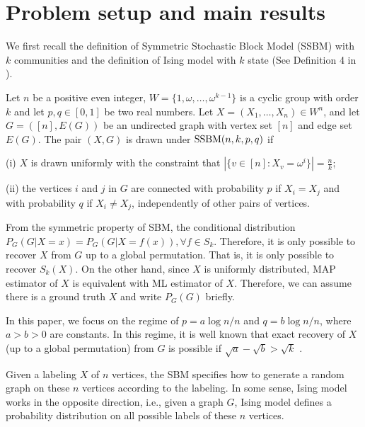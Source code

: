 \documentclass{article}
\begin{document}
\section{Problem setup and main results} \label{s:Preliminaries}
We first recall the definition of Symmetric Stochastic Block Model (SSBM) with $k$ communities and the definition of Ising model with $k$ state (See Definition 4 in \cite{Abbe17}).
\begin{definition} \label{def:SSBM}
Let $n$ be a positive even integer, $W= \{1, \omega, \dots, \omega^{k-1}\}$ is a cyclic group with order $k$ and let $p,q\in[0,1]$ be two real numbers. Let $X=(X_1,\dots,X_n)\in W^n$, and let $G=([n],E(G))$ be an undirected graph with vertex set $[n]$ and edge set $E(G)$. The pair $(X,G)$ is drawn under $\operatorname{SSBM}(n,k,p,q)$ if 

\noindent
(i) $X$ is drawn uniformly with the constraint that $|\{v \in [n] : X_v = \omega^i\}| = \frac{n}{k}$;

\noindent
(ii) the vertices $i$ and $j$ in $G$ are connected with probability $p$ if $X_i=X_j$ and with probability $q$ if $X_i \neq X_j$, independently of other pairs of vertices.
\end{definition}
 
	From the symmetric property of SBM, the conditional distribution $P_G(G|X=x) = P_G(G|X=f(x)), \forall f \in S_k$. Therefore, it is only possible to recover $X$ from $G$ up to a global permutation. That is, it is only possible to recover $S_k(X)$. On the other hand, since $X$ is uniformly distributed, MAP estimator of $X$ is equivalent with
	ML estimator of $X$. Therefore, we can assume there is a ground truth
	$X$ and write $P_G(G)$ briefly.

In this paper, we focus on the regime of $p=a\log n/n$ and $q=b\log n/n$, where $a>b> 0$ are constants. In this regime, it is well known that exact recovery of $X$ (up to a global permutation) from $G$ is possible if $\sqrt{a}-\sqrt{b} > \sqrt{k}$ \cite{abbe2015community}.

Given a labeling $X$ of $n$ vertices, the SBM specifies how to generate a random graph on these $n$ vertices according to the labeling. In some sense, Ising model works in the opposite direction, i.e., given a graph $G$, Ising model defines a probability distribution on all possible labels of these $n$ vertices. 
\end{document}
